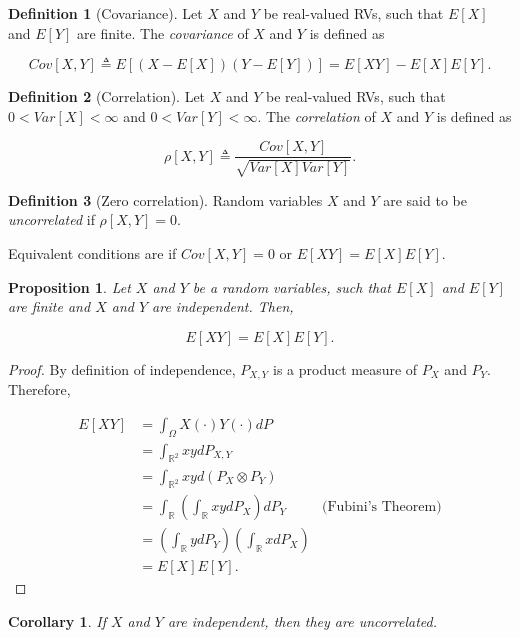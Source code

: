 \documentclass{book}
\theoremstyle{plain}%
\newtheorem{corollary}{Corollary}[section]
\newtheorem{proposition}{Proposition}[section]
\theoremstyle{definition}
\newtheorem{definition}{Definition}[section]
\begin{document}
\begin{definition}[Covariance] Let $X$ and $Y$ be real-valued RVs, such that $E[X]$ and $E[Y]$ are finite.  The \emph{covariance} of $X$ and $Y$ is defined as

$$Cov[X,Y] \triangleq E[(X - E[X])(Y - E[Y])] = E[XY] - E[X]E[Y].$$
\end{definition}

\begin{definition}[Correlation]
Let $X$ and $Y$ be real-valued RVs, such that $0 < Var[X] < \infty$ and $0 < Var[Y] < \infty$. The \emph{correlation} of $X$ and $Y$ is defined as

$$\rho[X,Y] \triangleq \frac{Cov[X,Y]}{\sqrt{Var[X]Var[Y]}}.$$
\end{definition}

\begin{definition}[Zero correlation]
Random variables $X$ and $Y$ are said to be \emph{uncorrelated} if $\rho[X,Y] = 0$.

Equivalent conditions are if $Cov[X,Y] = 0$ or $E[XY] = E[X]E[Y]$.
\end{definition}

\begin{proposition}
Let $X$ and $Y$ be a random variables, such that $E[X]$ and $E[Y]$ are finite and $X$ and $Y$ are independent. Then,

$$E[XY] = E[X]E[Y].$$
\end{proposition}

\begin{proof}
By definition of independence, $P_{X,Y}$ is a product measure of $P_X$ and $P_Y$. Therefore,

\begin{align*}
E[XY] &= \int_\Omega X(\cdot)Y(\cdot) dP  \\
&= \int_{\mathbb{R}^2} x y dP_{X,Y} \\
&= \int_{\mathbb{R}^2} x y d(P_X \otimes P_Y) \\
&= \int_\mathbb{R} \left(\int_\mathbb{R} xy dP_X \right) dP_Y & \text{(Fubini's Theorem)} \\
&= \left(\int_\mathbb{R} y dP_Y \right)  \left(\int_\mathbb{R} x dP_X \right) \\
&= E[X]E[Y].
\end{align*}
\end{proof}


\begin{corollary}
If $X$ and $Y$ are independent, then they are uncorrelated.
\end{corollary}
\end{document}
